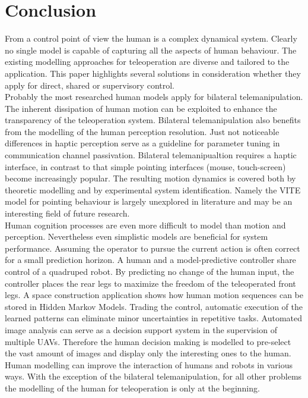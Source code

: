 \documentclass[a4paper,twoside, openright,12pt]{report}
\begin{document}



\chapter{Conclusion}
From a control point of view the human is a complex dynamical system. Clearly no single model is capable of capturing all the aspects of human behaviour. The existing modelling approaches for teleoperation are diverse and tailored to the application. This paper highlights several solutions in consideration whether they apply for direct, shared or supervisory control.\\
Probably the most researched human models apply for bilateral telemanipulation. The inherent dissipation of human motion can be exploited to enhance the transparency of the teleoperation system. Bilateral telemanipulation also benefits from the modelling of the human perception resolution. Just not noticeable differences in haptic perception serve as a guideline for parameter tuning in communication channel passivation. Bilateral telemanipualtion requires a haptic interface, in contrast to that simple pointing interfaces (mouse, touch-screen) become increasingly popular. The resulting motion dynamics is covered both by theoretic modelling and by experimental system identification. Namely the VITE model for pointing behaviour is largely unexplored in literature and may be an interesting field of future research.\\
Human cognition processes are even more difficult to model than motion and perception. Nevertheless even simplistic models are beneficial for system performance. Assuming the operator to pursue the current action is often correct for a small prediction horizon. A human and a model-predictive controller share control of a quadruped robot. By predicting no change of the human input, the controller places the rear legs to maximize the freedom of the teleoperated front legs. A space construction application shows how human motion sequences can be stored in Hidden Markov Models. Trading the control, automatic execution of the learned patterns can eliminate minor uncertainties in repetitive tasks.
Automated image analysis can serve as a decision support system in the supervision of multiple UAVs. Therefore the human decision making is modelled to pre-select the vast amount of images and display only the interesting ones to the human.\\      
Human modelling can improve the  interaction of humans and robots in various ways. With the exception of the bilateral telemanipulation, for all other problems the modelling of the human for teleoperation is only at the beginning.  
\end{document}

